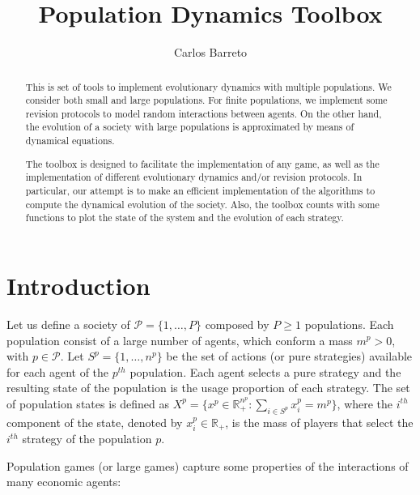 \documentclass[a4paper,10pt]{article}
\title{Population Dynamics Toolbox}
\author{Carlos Barreto}
\def\th{^{th}}
\newcommand{\pop}{\mathcal{P}}
\def\th{^{th}}
\begin{document}
\maketitle



\begin{abstract}
 This is set of tools to implement evolutionary dynamics with multiple populations. We consider both small and large populations. For finite populations, we implement some revision protocols to model random interactions between agents. On the other hand, the evolution of a society with large populations is approximated by means of dynamical equations. 
 
 The toolbox is designed to facilitate the implementation of any game, as well as the implementation of different evolutionary dynamics and/or revision protocols.  In particular, our attempt is to make an efficient implementation of the algorithms to compute the dynamical evolution of the society. Also, the toolbox counts with some functions to plot the state of the system and the evolution of each strategy.
 
 
 
 
 
\end{abstract}


\tableofcontents



\section{Introduction}



Let us define a society of $\pop = \{ 1, \ldots, P\}$ composed by $P \geq 1$ populations. Each population consist of a large number of agents, which conform a mass $m^p > 0$, with $p \in \pop$. 
Let $S^p = \{ 1, \ldots, n^p \}$ be the set of actions (or pure strategies) available for each agent of the $p\th$ population. 
Each agent selects a pure strategy and the resulting state of the population is the usage proportion of each strategy. The set of population states is defined as $X^p = \{ x^p \in \mathbb{R}_+^{n^p} : \sum_{i \in S^p} x_i^p = m^p \}$, where the $i\th$ component of the state, denoted by $x_i^p \in \mathbb{R}_+$, is the mass of players that select the $i\th$ strategy of the population $p$.

Population games (or large games) capture some properties of the interactions of many economic agents:
\end{document}

